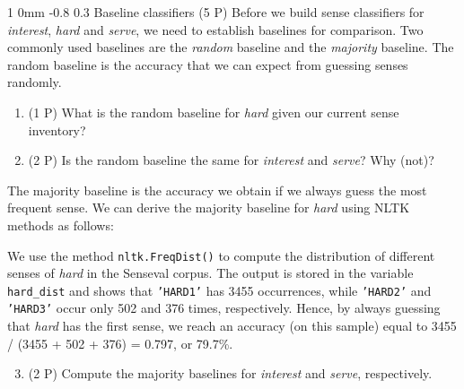 \documentclass[11pt]{article}
\makeatletter
\newcommand{\newsec}[2]{\section{#1}\label{sec:#2}\noindent}
\renewcommand{\section}{\@startsection
{section}%
{1}%
{0mm}%
{-0.8\baselineskip}%
{0.3\baselineskip}%
{\bfseries\large}}%
\makeatother
\begin{document}
\newsec{Baseline classifiers (5 P)}{baseline}%
Before we build sense classifiers for \emph{interest}, \emph{hard} and
\emph{serve}, we need to establish baselines for comparison.  Two
commonly used baselines are the \emph{random} baseline and the
\emph{majority} baseline. The random baseline is the accuracy that we
can expect from guessing senses randomly.
\begin{enumerate}[topsep=0.2cm,noitemsep]
\item (1 P) What is the random baseline for \emph{hard} given our current
  sense inventory?
\item (2 P) Is the random baseline the same for \emph{interest} and
  \emph{serve}? Why (not)?
\end{enumerate}
The majority baseline is the accuracy we obtain if we always guess the
most frequent sense. We can derive the majority baseline for
\emph{hard} using NLTK methods as follows:
\begin{center}
\fbox{
\scalebox{0.9}{

}}
\end{center}
We use the method {\tt nltk.FreqDist()} to compute the distribution of
different senses of \emph{hard} in the Senseval corpus. The output is
stored in the variable {\tt hard\_dist} and shows that {\tt 'HARD1'}
has 3455 occurrences, while {\tt 'HARD2'} and {\tt 'HARD3'} occur only
502 and 376 times, respectively. Hence, by always guessing that
\emph{hard} has the first sense, we reach an accuracy (on this sample)
equal to 3455 / (3455 + 502 + 376) = 0.797, or 79.7\%.
\begin{enumerate}[topsep=0.2cm,noitemsep]
\setcounter{enumi}{2}
\item (2 P) Compute the majority baselines for \emph{interest} and \emph{serve}, respectively.
\end{enumerate}
\end{document}
